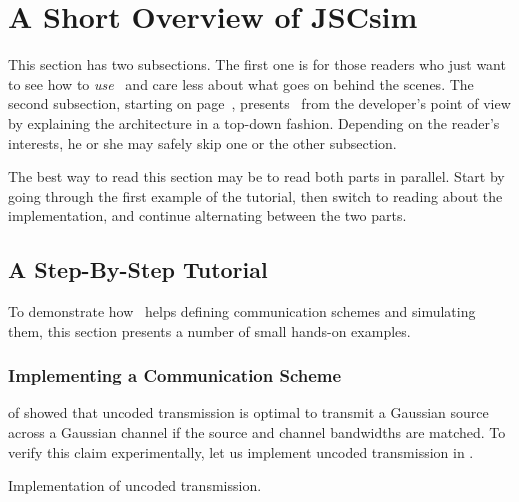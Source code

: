 \section{A Short Overview of JSCsim}\label{sec:overview}

This section has two subsections. The first one is for those readers who just
want to see how to \emph{use} \jscsim\ and care less about what goes on behind
the scenes. The second subsection, starting on page~\pageref{sec:impoverview},
presents \jscsim\ from the developer's point of view by explaining the
architecture in a top-down fashion. Depending on the reader's interests, he or
she may safely skip one or the other subsection. 

The best way to read this section may be to read both parts in parallel. Start
by going through the first example of the tutorial, then switch to reading about
the implementation, and continue alternating between the two parts.

\subsection{A Step-By-Step Tutorial}\label{sec:tutorial}

To demonstrate how \jscsim\ helps defining communication schemes and simulating
them, this section presents a number of small hands-on examples. 

\subsubsection{Implementing a Communication Scheme}

 of  showed that uncoded transmission
is optimal to transmit a Gaussian source across a Gaussian channel if the source
and channel bandwidths are matched. To verify this claim experimentally, let us
implement uncoded transmission in \jscsim. 

\begin{listing}
  \caption{Implementation of uncoded transmission.}
  \label{lst:uncoded}
\end{listing}

